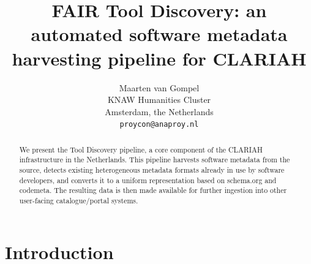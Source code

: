 \documentclass[a4paper,11pt]{article}
\title{FAIR Tool Discovery: an automated software metadata harvesting pipeline for CLARIAH}
\author{Maarten van Gompel \\
  KNAW Humanities Cluster \\
  Amsterdam, the Netherlands \\
  {\tt proycon@anaproy.nl} %
}
\date{}
\begin{document}
\maketitle
\begin{abstract}
  We present the Tool Discovery pipeline, a core component of the CLARIAH
    infrastructure in the Netherlands. This pipeline harvests software metadata
    from the source, detects existing heterogeneous metadata formats already in
    use by software developers, and converts it to a uniform representation
    based on schema.org and codemeta. The resulting data is then made available
    for further ingestion into other user-facing catalogue/portal systems. 
\end{abstract}

\section{Introduction} \label{intro}

%

\end{document}
